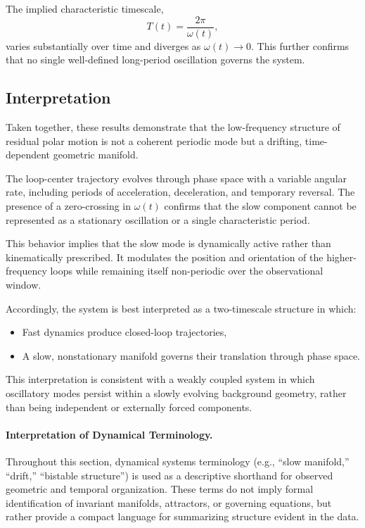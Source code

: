 \documentclass[twocolumn,9pt]{revtex4-2}
\begin{document}
The implied characteristic timescale,
\[
T(t) = \frac{2\pi}{\omega(t)},
\]
varies substantially over time and diverges as $\omega(t) \rightarrow 0$. This further confirms that no single well-defined long-period oscillation governs the system.

\subsection{Interpretation}
\label{subsec:interpretation}

Taken together, these results demonstrate that the
low-frequency structure of residual polar motion is not
a coherent periodic mode but a drifting, time-dependent
geometric manifold.

The loop-center trajectory evolves through phase space
with a variable angular rate, including periods of
acceleration, deceleration, and temporary reversal.
The presence of a zero-crossing in $\omega(t)$ confirms
that the slow component cannot be represented as a
stationary oscillation or a single characteristic period.

This behavior implies that the slow mode is dynamically
active rather than kinematically prescribed. It modulates
the position and orientation of the higher-frequency
loops while remaining itself non-periodic over the
observational window.

Accordingly, the system is best interpreted as a
two-timescale structure in which:

\begin{itemize}
\item Fast dynamics produce closed-loop trajectories,
\item A slow, nonstationary manifold governs their
translation through phase space.
\end{itemize}

This interpretation is consistent with a weakly coupled
system in which oscillatory modes persist within a
slowly evolving background geometry, rather than being
independent or externally forced components.

\paragraph{Interpretation of Dynamical Terminology.}
Throughout this section, dynamical systems terminology (e.g., ``slow manifold,'' ``drift,'' ``bistable structure'') is used as a descriptive shorthand for observed geometric and temporal organization. These terms do not imply formal identification of invariant manifolds, attractors, or governing equations, but rather provide a compact language for summarizing structure evident in the data.
\end{document}

